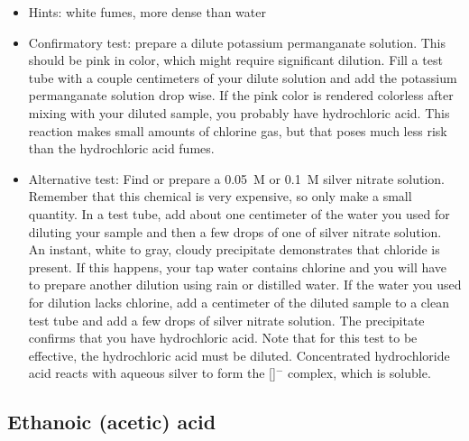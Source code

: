 \begin{itemize}

\item{Hints: white fumes, 
more dense than water}

\item{Confirmatory test: 
prepare a dilute potassium permanganate solution. 
This should be pink in color, 
which might require significant dilution. 
Fill a test tube with a couple centimeters of your dilute solution 
and add the potassium permanganate solution drop wise. 
If the pink color is rendered colorless 
after mixing with your diluted sample, 
you probably have hydrochloric acid. 
This reaction makes small amounts of chlorine gas, 
but that poses much less risk than the hydrochloric acid fumes.}

\item{Alternative test: 
Find or prepare a 0.05~M or 0.1~M silver nitrate solution. 
Remember that this chemical is very expensive, 
so only make a small quantity. 
In a test tube, 
add about one centimeter of the water you used 
for diluting your sample 
and then a few drops of one of silver nitrate solution. 
An instant, 
white to gray, 
cloudy precipitate demonstrates that chloride is present. 
If this happens, 
your tap water contains chlorine 
and you will have to prepare another dilution 
using rain or distilled water. 
If the water you used for dilution lacks chlorine, 
add a centimeter of the diluted sample 
to a clean test tube and add a few drops of silver nitrate solution. 
The precipitate confirms that you have hydrochloric acid. 
Note that for this test to be effective, 
the hydrochloric acid must be diluted. 
Concentrated hydrochloride acid reacts with aqueous silver 
to form the []$^-$ complex, 
which is soluble.}

\end{itemize}

\subsection{Ethanoic (acetic) acid}

